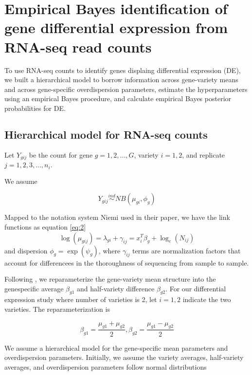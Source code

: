 \section{Empirical Bayes identification of gene differential expression from RNA-seq read counts}


To use RNA-seq counts to identify genes displaing differential expression (DE), we built a hierarchical model to borrow information across gene-variety means and across gene-specific overdispersion parameters, estimate the hyperparameters using an empirical Bayes procedure, and calculate empirical Bayes posterior probabilities for DE. 

\subsection{Hierarchical model for RNA-seq counts}

Let $Y_{gij}$ be the count for gene $g=1,2,..., G$, variety $i=1,2$, and replicate $j=1,2,3,...,n_i$.

We assume

\begin{equation}
\label{eq:1}
Y_{gij} \stackrel{ind}{\sim} NB(\mu_{gi}, \phi_g)
\end{equation}

Mapped to the notation system Niemi used in their paper\citep{niemi2015empirical}, we have the link functions as equation \ref{eq:2}
\begin{equation}
\label{eq:2}
\log(\mu_{gij}) = \lambda_{gi} + \gamma_{ij} = x_i^T \beta_g + \log_e (N_{ij})
\end{equation}
and dispersion $\phi_g = \exp{(\psi_g)}$, where $\gamma_{ij}$ terms are normalization factors that account for differencees in the thoroughness of sequencing from sample to sample. 

Following \citep{ji2014estimation}, we reparameterize the gene-variety mean structure into the genespecific average $\beta_{g1}$ and half-variety difference $\beta_{g2}$. For our differential expression study where number of varieties is 2, let $i=1,2$ indicate the two varieties. The reparameterization is

\begin{equation}
\label{eq:3}
\beta_{g1} = \frac{\mu_{g1}+\mu_{g2}}{2}, \beta_{g2} = \frac{\mu_{g1}-\mu_{g2}}{2}
\end{equation}

We assume a hierarchical model for the gene-specific mean parameters and overdispersion parameters. Initially, we assume the variety averages, half-variety averages, and overdispersion parameters follow normal distributions

